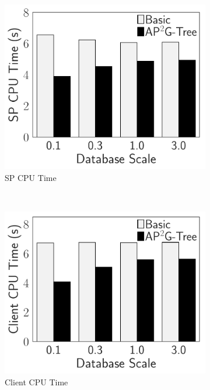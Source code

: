 \begin{figure}[t]
    \centering
    \begin{subfigure}{.33\linewidth}
        \includegraphics[width=\linewidth]{exp-figs/access-control/scale_sp.pdf}
        \caption{SP CPU Time}
    \end{subfigure}~%
    \begin{subfigure}{.33\linewidth}
        \includegraphics[width=\linewidth]{exp-figs/access-control/scale_user.pdf}
        \caption{Client CPU Time}
    \end{subfigure}~%
    \begin{subfigure}{.33\linewidth}

\end{subfigure}
\end{figure}
